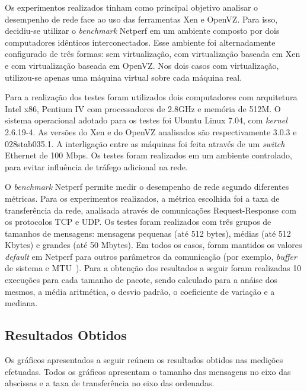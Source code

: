 \documentclass[12pt]{article}
\begin{document}
Os experimentos realizados tinham como principal objetivo analisar o desempenho de rede face ao uso das ferramentas Xen e OpenVZ. Para isso, decidiu-se utilizar o \emph{benchmark} Netperf em um ambiente composto por dois computadores idênticos interconectados. Esse ambiente foi alternadamente configurado de três formas: sem virtualização, com virtualização baseada em Xen e com virtualização baseada em OpenVZ. Nos dois casos com virtualização, utilizou-se apenas uma máquina virtual sobre cada máquina real.

Para a realização dos testes foram utilizados dois computadores com arquitetura Intel x86, Pentium IV com processadores de 2.8GHz e memória de 512M. O sistema operacional adotado para os testes foi Ubuntu Linux 7.04, com \emph{kernel} 2.6.19-4. As versões do Xen e do OpenVZ analisados são respectivamente 3.0.3 e 028stab035.1. A interligação entre as máquinas foi feita através de um \emph{switch} Ethernet de 100 Mbps. Os testes foram realizados em um ambiente controlado, para evitar influência de tráfego adicional na rede.

O \emph{benchmark} Netperf permite medir o desempenho de rede segundo diferentes métricas. Para os experimentos realizados, a métrica escolhida foi a taxa de transferência da rede, analisada através de comunicações Request-Response com os protocolos TCP e UDP. Os testes foram realizados com três grupos de tamanhos de mensagens: mensagens pequenas (até 512 bytes), médias (até 512 Kbytes) e grandes (até 50 Mbytes). Em todos os casos, foram mantidos os valores \emph{default} em Netperf para outros parâmetros da comunicação (por exemplo, \emph{buffer} de sistema e MTU~\cite{netperf}). Para a obtenção dos resultados a seguir foram realizadas 10 execuções para cada tamanho de pacote, sendo calculado para a anáise dos mesmos, a média aritmética, o desvio padrão, o coeficiente de variação e a mediana. 





\subsection{Resultados Obtidos}

Os gráficos apresentados a seguir reúnem os resultados obtidos nas medições efetuadas. Todos os gráficos apresentam o tamanho das mensagens no eixo das abscissas e a taxa de transferência no eixo das ordenadas.
\end{document}
